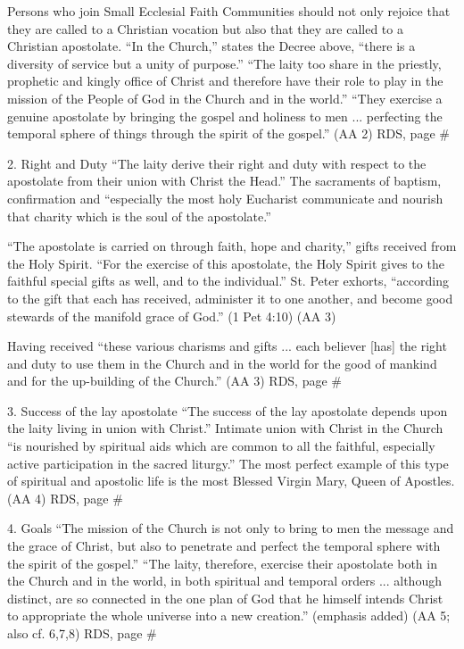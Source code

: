 \documentclass[oneside]{book}
\begin{document}
Persons who join Small Ecclesial Faith Communities should not only rejoice that
they are called to a Christian vocation but also that they are called to a
Christian apostolate. ``In the Church,'' states the Decree above, ``there is a
diversity of service but a unity of purpose.'' ``The laity too share in the
priestly, prophetic and kingly office of Christ and therefore have their role to
play in the mission of the People of God in the Church and in the world.''
``They exercise a genuine apostolate by bringing the gospel and holiness to men
... perfecting the temporal sphere of things through the spirit of the gospel.''
(AA 2)
RDS, page \#

2. Right and Duty
``The laity derive their right and duty with respect to the apostolate from
their union with Christ the Head.'' The sacraments of baptism, confirmation and
``especially the most holy Eucharist communicate and nourish that charity which
is the soul of the apostolate.''

``The apostolate is carried on through faith, hope and charity,'' gifts received
from the Holy Spirit. ``For the exercise of this apostolate, the Holy Spirit
gives to the faithful special gifts as well, and to the individual.'' St. Peter
exhorts, ``according to the gift that each has received, administer it to one
another, and become good stewards of the manifold grace of God.'' (1 Pet 4:10)
(AA 3)

Having received ``these various charisms and gifts ... each believer [has] the
right and duty to use them in the Church and in the world for the good of
mankind and for the up-building of the Church.'' (AA 3)
RDS, page \#

3. Success of the lay apostolate
``The success of the lay apostolate depends upon the laity living in union with
Christ.'' Intimate union with Christ in the Church ``is nourished by spiritual
aids which are common to all the faithful, especially active participation in
the sacred liturgy.'' The most perfect example of this type of spiritual and
apostolic life is the most Blessed Virgin Mary, Queen of Apostles. (AA 4)
RDS, page \#

4. Goals
``The mission of the Church is not only to bring to men the message and the
grace of Christ, but also to penetrate and perfect the temporal sphere with the
spirit of the gospel.'' ``The laity, therefore, exercise their apostolate both
in the Church and in the world, in both spiritual and temporal orders
... although distinct, are so connected in the one plan of God that he himself
intends Christ to appropriate the whole universe into a new creation.''
(emphasis added) (AA 5; also cf. 6,7,8)
RDS, page \#
\end{document}

